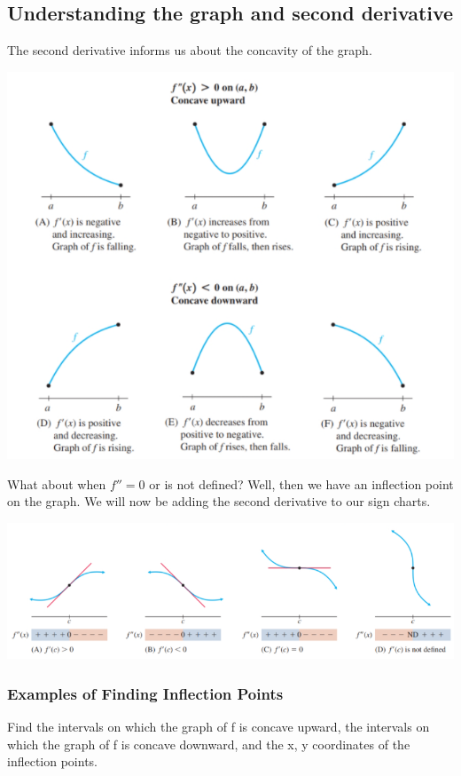 \documentclass[14pt]{extarticle}
\begin{document}
\subsection{Understanding the graph and second derivative}
The second derivative informs us about the concavity of the graph.
 \begin{center}\includegraphics[width=1\linewidth]{11-2-1}\end{center}
\vspace{1em}

What about when $f''=0$ or is not defined? Well, then we have an inflection point on the graph. We will now be adding the second derivative to our sign charts.
\begin{center}\includegraphics[width=1\linewidth]{11-2-2}\end{center}

\subsubsection{Examples of Finding Inflection Points}
Find the intervals on which the graph of f is concave upward, the intervals on which the graph of f is concave downward, and the x, y coordinates of the inflection points.
\end{document}
